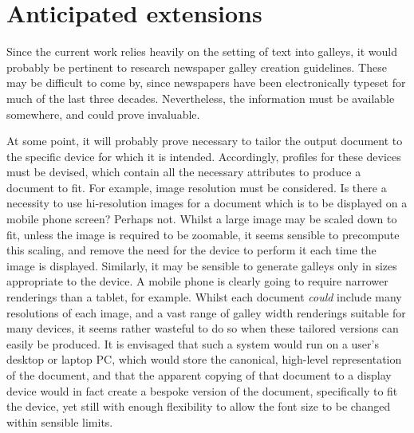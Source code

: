 \section{Anticipated extensions}
Since the current work relies heavily on the setting of text into galleys, it would probably be
pertinent to research newspaper galley creation guidelines. These may be difficult to come by, since
newspapers have been electronically typeset for much of the last three decades. Nevertheless, the
information must be available somewhere, and could prove invaluable.

At some point, it will probably prove necessary to tailor the output document to the specific device
for which it is intended. Accordingly, profiles for these devices must be devised, which contain all
the necessary attributes to produce a document to fit. For example, image resolution must be
considered. Is there a necessity to use hi-resolution images for a document which is to be displayed
on a mobile phone screen? Perhaps not. Whilst a large image may be scaled down to fit, unless the
image is required to be zoomable, it seems sensible to precompute this scaling, and remove the need
for the device to perform it each time the image is displayed. Similarly, it may be sensible to
generate galleys only in sizes appropriate to the device. A mobile phone is clearly going to require
narrower renderings than a tablet, for example. Whilst each document \emph{could} include many
resolutions of each image, and a vast range of galley width renderings suitable for many devices, it
seems rather wasteful to do so when 
these tailored versions can easily be produced. It is envisaged that such a system would run on a
user's desktop or laptop PC, which would store the canonical, high-level representation of the
document, and that the apparent copying of that document to a display device would in fact create a
bespoke version of the document, specifically to fit the device, yet still with enough flexibility
to allow the font size to be changed within sensible limits.



